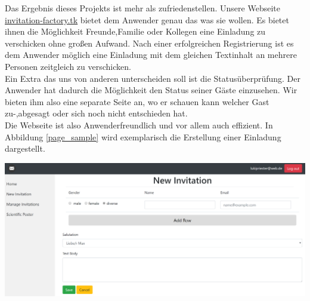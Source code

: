\documentclass[landscape,a0paper,fontscale=0.35]{baposter} %
\begin{document}
\begin{poster}
{
	\begin{multicols}{3}
		Das Ergebnis dieses Projekts ist mehr als zufriedenstellen. Unsere Webseite \url{invitation-factory.tk} bietet dem Anwender genau das was sie wollen. Es bietet ihnen die Möglichkeit Freunde,Familie oder Kollegen eine Einladung zu verschicken ohne großen Aufwand. Nach einer erfolgreichen Registrierung ist es dem Anwender möglich eine Einladung mit dem gleichen Textinhalt an mehrere Personen zeitgleich zu verschicken.\\
		Ein Extra das uns von anderen unterscheiden soll ist die Statusüberprüfung. Der Anwender hat dadurch die Möglichkeit den Status seiner Gäste einzusehen. Wir bieten ihm also eine separate Seite an, wo er schauen kann welcher Gast zu-,abgesagt oder sich noch nicht entschieden hat.\\
		Die Webseite ist also Anwenderfreundlich und vor allem auch effizient. In Abbildung \ref{page_sample} wird exemplarisch die Erstellung einer Einladung dargestellt.
		\begin{center}
					\includegraphics[width=0.6\linewidth]{New_Invitation_Seite.PNG}
			\label{page_sample}
		\end{center}

	\end{multicols}
	
}


\end{poster}
\end{document}
